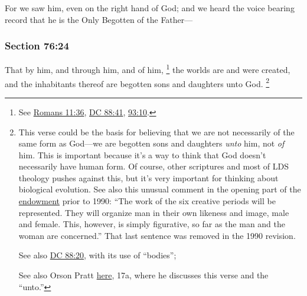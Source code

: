 		For we saw him, even on the right hand of God; and we heard the voice bearing record that he is the Only Begotten of the Father---


	\subsubsection{Section 76:24} %
		\label{DC76-24}

		That by him, and through him, and of him,%
			\footnote{%
				\label{DC76-24-by}%
				See \hyperref[ROMANS-11-36]{Romans 11:36}, \hyperref[DC88-41]{DC 88:41}, \hyperref[DC93-10]{93:10}.
				}
		the worlds are and were created, and the inhabitants thereof are begotten sons and daughters unto God.%
			\footnote{%
				\label{DC76-24-unto}%
				This verse could be the basis for believing that we are not necessarily of the same form as God---we are begotten sons and daughters \textit{unto} him, not \textit{of} him. This is important because it's a way to think that God doesn't necessarily have human form. Of course, other scriptures and most of LDS theology pushes against this, but it's very important for thinking about biological evolution. See also this unusual comment in the opening part of the \hyperref[TEMPLE-ENDOWMENT-ENDOW-PRE-1990-INTRO]{endowment} prior to 1990: ``The work of the six creative periods will be represented. They will organize man in their own likeness and image, male and female. This, however, is simply figurative, so far as the man and the woman are concerned.'' That last sentence was removed in the 1990 revision.
				
				See also \hyperref[DC88-20]{DC 88:20}, with its use of ``bodies'';
				
				See also Orson Pratt \hyperref[EMS-1852-OP-28-AUG-1852]{here}, 17a, where he discusses this verse and the ``unto.''
				}



